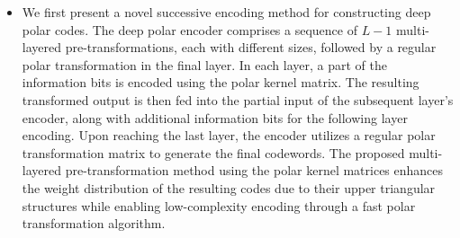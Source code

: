 \documentclass[conference]{IEEEtran}
\begin{document}
    
        \begin{itemize}
    	
\item    	  We first present a novel successive encoding method for constructing deep polar codes. The deep polar encoder comprises a sequence of $L-1$ multi-layered pre-transformations, each with different sizes, followed by a regular polar transformation in the final layer. In each layer, a part of the information bits is encoded using the polar kernel matrix. The resulting transformed output is then fed into the partial input of the subsequent layer's encoder, along with additional information bits for the following layer encoding. Upon reaching the last layer, the encoder utilizes a regular polar transformation matrix to generate the final codewords. The proposed multi-layered pre-transformation method using the polar kernel matrices enhances the weight distribution of the resulting codes due to their upper triangular structures while enabling low-complexity encoding through a fast polar transformation algorithm.  
    	
    	
    	
%    	
    	

\end{itemize}
\end{document}
